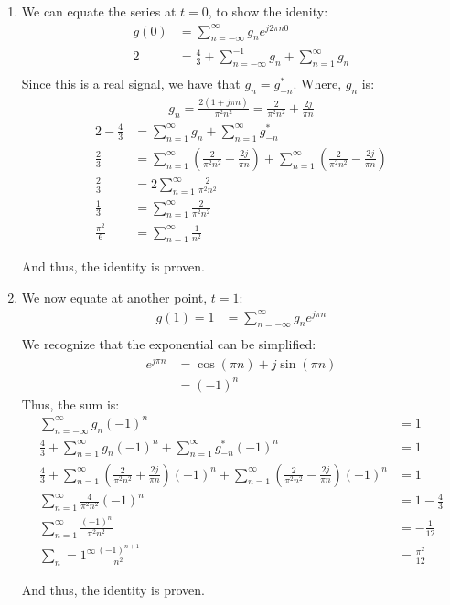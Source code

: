 \documentclass{article}
\begin{document}
\begin{enumerate}[label=3.\arabic*]
    \item We can equate the series at $t = 0$, to show the idenity:
    \begin{align*}
        g(0) &= \sum_{n=-\infty}^{\infty} g_n e^{j2\pi n 0} \\
        2 &= \frac{4}{3} + \sum_{n=-\infty}^{-1} g_n + \sum_{n=1}^{\infty} g_n \\
    \end{align*}
    Since this is a real signal, we have that $g_n = g_{-n}^*$. Where, $g_n$ is:
    \begin{align*}
        g_n = \frac{2(1+j\pi n)}{\pi^2 n^2} = \frac{2}{\pi^2 n^2} + \frac{2j}{\pi n}
    \end{align*}
    \begin{align*}
        2 - \frac{4}{3} &= \sum_{n=1}^{\infty} g_n + \sum_{n=1}^{\infty} g_{-n}^* \\
        \frac{2}{3} &= \sum_{n=1}^{\infty} \left(\frac{2}{\pi^2 n^2} + \frac{2j}{\pi n}\right) + \sum_{n=1}^{\infty} \left(\frac{2}{\pi^2 n^2} - \frac{2j}{\pi n}\right) \\
        \frac{2}{3} &= 2 \sum_{n=1}^{\infty} \frac{2}{\pi^2 n^2} \\
        \frac{1}{3} &= \sum_{n=1}^{\infty} \frac{2}{\pi^2 n^2} \\
        \frac{\pi^2}{6} &= \sum_{n=1}^{\infty} \frac{1}{n^2}
    \end{align*}

    And thus, the identity is proven.

    \item We now equate at another point, $t = 1$:
    \begin{align*}
        g(1) = 1 &= \sum_{n=-\infty}^{\infty} g_n e^{j\pi n} \\
    \end{align*}
    We recognize that the exponential can be simplified:
    \begin{align*}
        e^{j\pi n} &= \cos(\pi n) + j \sin(\pi n) \\
        &= (-1)^n
    \end{align*}
    Thus, the sum is:
    \begin{align*}
        \sum_{n=-\infty}^{\infty} g_n (-1)^n &= 1 \\
        \frac{4}{3} + \sum_{n=1}^{\infty} g_n (-1)^n + \sum_{n=1}^{\infty} g_{-n}^* (-1)^n &= 1 \\
        \frac{4}{3} + \sum_{n=1}^{\infty} \left(\frac{2}{\pi^2 n^2} + \frac{2j}{\pi n}\right) (-1)^n + \sum_{n=1}^{\infty} \left(\frac{2}{\pi^2 n^2} - \frac{2j}{\pi n}\right) (-1)^n &= 1 \\
        \sum_{n=1}^{\infty} \frac{4}{\pi^2 n^2} (-1)^n &= 1 - \frac{4}{3} \\
        \sum_{n=1}^{\infty} \frac{(-1)^n}{\pi^2 n^2} &= -\frac{1}{12} \\
        \sum_n=1^{\infty} \frac{(-1)^{n+1}}{n^2} &= \frac{\pi^2}{12}
    \end{align*}

    And thus, the identity is proven.

\end{enumerate}
\end{document}
